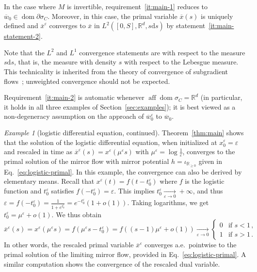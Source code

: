 \documentclass[11pt,english,reqno]{article}
\DeclareMathOperator{\dom}{dom}
\DeclareMathOperator{\aff}{aff}
\newcommand{\diff}{\mathrm{d}}
\newcommand{\R}{\mathbb{R}}
\renewcommand{\geq}{\geqslant}
\theoremstyle{plain}
\theoremstyle{definition}
\theoremstyle{remark}
\newtheorem{example}[proposition]{Example}
\numberwithin{equation}{section}
\begin{document}
In the case where $M$ is invertible, requirement~\ref{it:main-1} reduces to $\overline{w}_0 \in \dom \partial \sigma_C$. Moreover, in this case, the primal variable $\overline{x}(s)$ is uniquely defined and $\overline{x}^\varepsilon$ converges to $\overline{x}$ in $L^2([0,S],\R^d, s\diff s)$ by statement~\ref{it:main-statement-2}.

Note that the $L^2$ and $L^1$ convergence statements are with respect to the measure $s \diff s$, that is, the measure with density $s$ with respect to the Lebesgue measure. This technicality is inherited from the theory of convergence of subgradient flows~\cite{attouch1977convergence}; unweighted convergence should not be expected. 

Requirement~\ref{it:main-2} is automatic whenever $\aff \dom \sigma_C = \R^d$ (in particular, it holds in all three examples of Section~\ref{sec:examples}); it is best viewed as a non-degeneracy assumption on the approach of $\overline{w}_0^\varepsilon$ to $\overline{w}_0$.

\begin{example}[logistic differential equation, continued]
	\label{ex:logistic-5}
	Theorem~\ref{thm:main} shows that the solution of the logistic differential equation, when initialized at $x^\varepsilon_0 = \varepsilon$ and rescaled in time as $\overline{x}^\varepsilon(s) = x^\varepsilon(\mu^\varepsilon s)$ with $\mu^\varepsilon = \log \frac{1}{\varepsilon}$, converges to the primal solution of the mirror flow with mirror potential $h = \iota_{\R_{\geq 0}}$ given in Eq.~\eqref{eq:logistic-primal}. In this example, the convergence can also be derived by elementary means. Recall that $x^\varepsilon(t) = f(t - t_0^\varepsilon)$ where $f$ is the logistic function and $t_0^\varepsilon$ satisfies $f(-t_0^\varepsilon) = \varepsilon$. This implies $t_0^\varepsilon \xrightarrow[\varepsilon\to 0]{} +\infty$, and thus $\varepsilon = f(-t_0^\varepsilon) = \frac{1}{1+e^{t_0^\varepsilon}} = e^{-t_0^\varepsilon}(1+o(1))$. Taking logarithms, we get $t_0^\varepsilon = \mu^\varepsilon + o(1)$. We thus obtain
	\begin{equation*}
		\overline{x}^\varepsilon(s) = x^\varepsilon(\mu^\varepsilon s) = f(\mu^\varepsilon s - t_0^\varepsilon) = f((s-1) \mu^\varepsilon + o(1)) \xrightarrow[\varepsilon\to 0]{} \begin{cases}
		0 & \text{if } s < 1 \, , \\
		1 & \text{if } s > 1 \, .
	\end{cases}
	\end{equation*} 
	In other words, the rescaled primal variable $\overline{x}^\varepsilon$ converges a.e.~pointwise to the primal solution of the limiting mirror flow, provided in Eq.~\eqref{eq:logistic-primal}. A similar computation shows the convergence of the rescaled dual variable.
\end{example}
\end{document}
